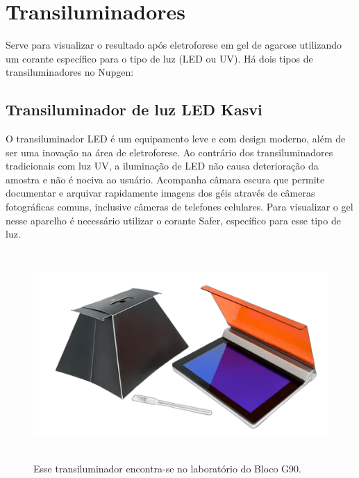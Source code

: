 \documentclass[
  letterpaper,
  DIV=11,
  numbers=noendperiod]{scrreprt}
\begin{document}
\hypertarget{transiluminadores}{%
\section{Transiluminadores}\label{transiluminadores}}

Serve para visualizar o resultado após eletroforese em gel de agarose
utilizando um corante específico para o tipo de luz (LED ou UV). Há dois
tipos de transiluminadores no Nupgen:

\hypertarget{transiluminador-de-luz-led-kasvi}{%
\subsection{Transiluminador de luz LED
Kasvi}\label{transiluminador-de-luz-led-kasvi}}

O transiluminador LED é um equipamento leve e com design moderno, além
de ser uma inovação na área de eletroforese. Ao contrário dos
transiluminadores tradicionais com luz UV, a iluminação de LED não causa
deterioração da amostra e não é nociva ao usuário. Acompanha câmara
escura que permite documentar e arquivar rapidamente imagens dos géis
através de câmeras fotográficas comuns, inclusive câmeras de telefones
celulares. Para visualizar o gel nesse aparelho é necessário utilizar o
corante Safer, específico para esse tipo de luz.

\begin{figure}

{\centering \includegraphics[width=\textwidth,height=3.125in]{figures/equipamentos/transiluminador_led.png}

}

\caption{Esse transiluminador encontra-se no laboratório do Bloco G90.}

\end{figure}
\end{document}
